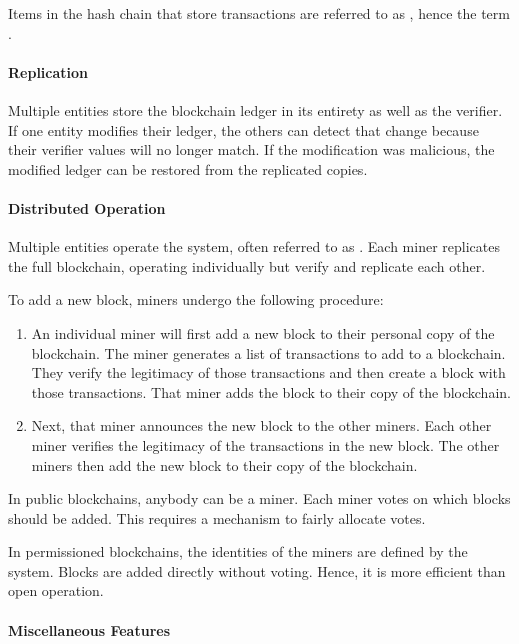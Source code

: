 Items in the hash chain that store transactions are referred to as , hence the term .

\paragraph{Replication}

Multiple entities store the blockchain ledger in its entirety as well as the verifier. If one entity modifies their ledger, the others can detect that change because their verifier values will no longer match. If the modification was malicious, the modified ledger can be restored from the replicated copies.

\paragraph{Distributed Operation}
Multiple entities operate the system, often referred to as . Each miner replicates the full blockchain, operating individually but verify and replicate each other.

To add a new block, miners undergo the following procedure:
\begin{enumerate}
    \item An individual miner will first add a new block to their personal copy of the blockchain. The miner generates a list of transactions to add to a blockchain. They verify the legitimacy of those transactions and then create a block with those transactions. That miner adds the block to their copy of the blockchain.
    \item Next, that miner announces the new block to the other miners. Each other miner verifies the legitimacy of the transactions in the new block. The other miners then add the new block to their copy of the blockchain.
\end{enumerate}

In public blockchains, anybody can be a miner. Each miner votes on which blocks should be added. This requires a mechanism to fairly allocate votes.

In permissioned blockchains, the identities of the miners are defined by the system. Blocks are added directly without voting. Hence, it is more efficient than open operation.

\paragraph{Miscellaneous Features}

